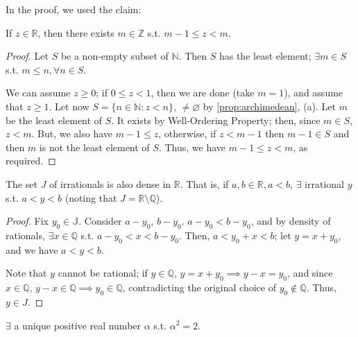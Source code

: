 \documentclass[12pt]{article}
\begin{document}
In the proof, we used the claim:

\begin{proposition}
  If $z \in \mathbb{R}$, then there exists $m \in \mathbb{Z}$ s.t. $m - 1 \leq z < m$.
\end{proposition}

\begin{proof}
  Let $S$ be a non-empty subset of $\mathbb{N}$. Then $S$ has the least element; $\exists m \in S$ s.t. $m \leq n, \forall n \in S$.

  We can assume $z \geq 0$; if $0 \leq z < 1$, then we are done (take $m = 1$), and assume that $z \geq 1$. Let now $S = \{n \in \mathbb{N} : z < n\}$, $\neq \varnothing$ by \cref{prop:archimedean}, (a). Let $m$ be the least element of $S$. It exists by Well-Ordering Property; then, since $m \in S$, $z < m$. But, we also have $m - 1 \leq z$, otherwise, if $z < m-1$ then $m - 1 \in S$ and then $m$ is not the least element of $S$. Thus, we have $m -1 \leq z < m$, as required.
\end{proof}

\begin{theorem}
  The set $J$ of irrationals is also dense in $\mathbb{R}$. That is, if $a,b \in \mathbb{R}, a < b$, $\exists$ irrational $y$ s.t. $a < y < b$ (noting that $J = \mathbb{R} \setminus \mathbb{Q}$).
\end{theorem}

\begin{proof}
  Fix $y_0 \in \mathbb{J}$. Consider $a - y_0$, $b - y_0$. $a - y_0 < b - y_0$, and by density of rationals, $\exists x \in \mathbb{Q}$ s.t. $a - y_0 < x < b - y_0$. Then, $a < y_0 + x < b$; let $y = x+y_0$, and we have $a < y < b$.

  Note that $y$ cannot be rational; if $y \in \mathbb{Q}$, $y = x + y_0 \implies y - x = y_0$, and since $x \in \mathbb{Q}$, $y - x \in \mathbb{Q} \implies y_0 \in \mathbb{Q}$, contradicting the original choice of $y_0 \notin \mathbb{Q}$. Thus, $y \in J$.
\end{proof}

\begin{theorem}
  $\exists$ a unique positive real number $\alpha$ s.t. $\alpha^2 = 2$.
\end{theorem}
\end{document}
